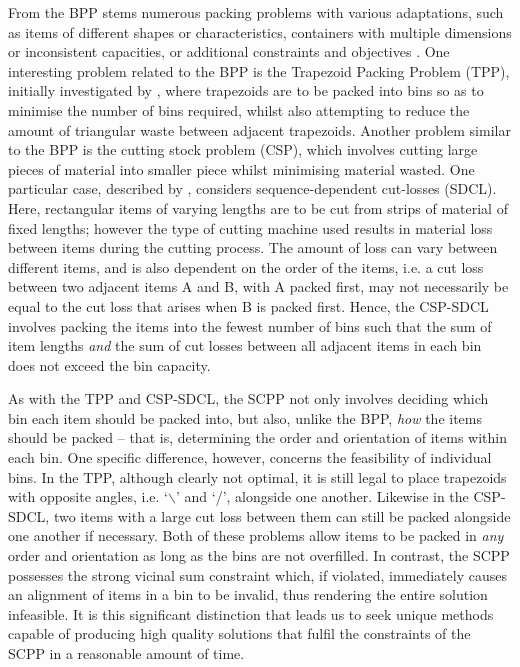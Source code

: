 \documentclass[authoryear]{elsarticle}
\begin{document}
\noindent From the BPP stems numerous packing problems with various adaptations, such as items of different shapes or characteristics, containers with multiple dimensions or inconsistent capacities, or additional constraints and objectives \citep{haouari2009, kenmochi2009, xavier2008}. One interesting problem related to the BPP is the Trapezoid Packing Problem (TPP), initially investigated by \citet{lewis2011}, where trapezoids are to be packed into bins so as to minimise the number of bins required, whilst also attempting to reduce the amount of triangular waste between adjacent trapezoids. Another problem similar to the BPP is the cutting stock problem (CSP), which involves cutting large pieces of material into smaller piece whilst minimising material wasted. One particular case, described by \citet{garraffa2016}, considers sequence-dependent cut-losses (SDCL). Here, rectangular items of varying lengths are to be cut from strips of material of fixed lengths; however the type of cutting machine used results in material loss between items during the cutting process. The amount of loss can vary between different items, and is also dependent on the order of the items, i.e. a cut loss between two adjacent items A and B, with A packed first, may not necessarily be equal to the cut loss that arises when B is packed first. Hence, the CSP-SDCL involves packing the items into the fewest number of bins such that the sum of item lengths \emph{and} the sum of cut losses between all adjacent items in each bin does not exceed the bin capacity.

As with the TPP and CSP-SDCL, the SCPP not only involves deciding which bin each item should be packed into, but also, unlike the BPP, \emph{how} the items should be packed -- that is, determining the order and orientation of items within each bin. One specific difference, however, concerns the feasibility of individual bins. In the TPP, although clearly not optimal, it is still legal to place trapezoids with opposite angles, i.e. `$\backslash$' and `/', alongside one another. Likewise in the CSP-SDCL, two items with a large cut loss between them can still be packed alongside one another if necessary. Both of these problems allow items to be packed in \emph{any} order and orientation as long as the bins are not overfilled. In contrast, the SCPP possesses the strong vicinal sum constraint which, if violated, immediately causes an alignment of items in a bin to be invalid, thus rendering the entire solution infeasible. It is this significant distinction that leads us to seek unique methods capable of producing high quality solutions that fulfil the constraints of the SCPP in a reasonable amount of time.
\end{document}
